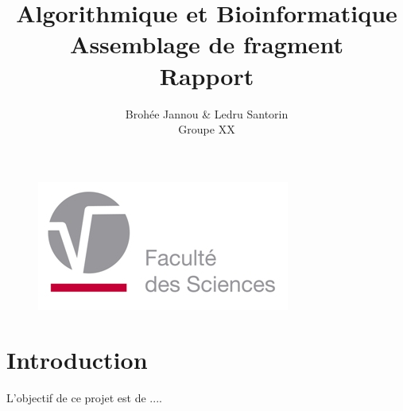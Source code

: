 \documentclass[a4paper]{article}
\begin{document}
\title{Algorithmique et Bioinformatique \\ Assemblage de fragment \\ Rapport}
\author{Broh\'ee Jannou \& Ledru Santorin  \\ Groupe XX}
\maketitle
\begin{figure}[!htb]
\begin{center}
  \includegraphics[width=\textwidth]{illustrations/UMONS_FS.jpg}
\end{center}
\end{figure}
\newpage
{}
\renewcommand{\contentsname}{Table des matières}
\tableofcontents

\newpage
{}
\section{Introduction}

\hspace{0.5cm}L'objectif de ce projet est de ....

\newpage
\end{document}
